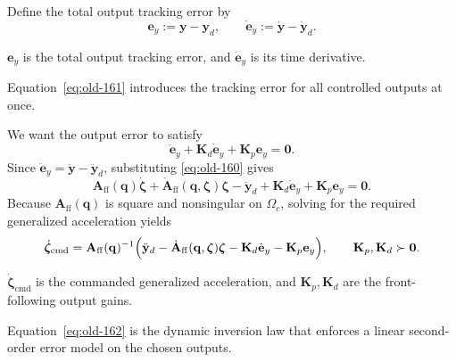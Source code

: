 \documentclass[12pt,a4paper]{report}
\newcommand{\newsymbols}[1]{\par\noindent{}#1\par\vspace{0.35em}}
\newcommand{\formulaannotation}[1]{\par\noindent{}#1\par\vspace{0.35em}}
\begin{document}
Define the total output tracking error by
\begin{equation}
\mathbf{e}_y := \mathbf{y} - \mathbf{y}_d,
\qquad
\dot{\mathbf{e}}_y := \dot{\mathbf{y}} - \dot{\mathbf{y}}_d.
\label{eq:old-161}
\end{equation}
\newsymbols{$\mathbf{e}_y$ is the total output tracking error, and $\dot{\mathbf{e}}_y$ is its time derivative.}
\formulaannotation{Equation~\eqref{eq:old-161} introduces the tracking error for all controlled outputs at once.}

We want the output error to satisfy
\begin{equation}
\ddot{\mathbf{e}}_y + \mathbf{K}_d\dot{\mathbf{e}}_y + \mathbf{K}_p\mathbf{e}_y = \mathbf{0}.
\end{equation}
Since $\ddot{\mathbf{e}}_y = \ddot{\mathbf{y}} - \ddot{\mathbf{y}}_d$, substituting \eqref{eq:old-160} gives
\begin{equation}
\mathbf{A}_{\mathrm{ff}}(\mathbf{q})\dot{\boldsymbol{\zeta}} +
\dot{\mathbf{A}}_{\mathrm{ff}}(\mathbf{q},\boldsymbol{\zeta})\boldsymbol{\zeta}
- \ddot{\mathbf{y}}_d
+ \mathbf{K}_d\dot{\mathbf{e}}_y
+ \mathbf{K}_p\mathbf{e}_y
= \mathbf{0}.
\end{equation}
Because $\mathbf{A}_{\mathrm{ff}}(\mathbf{q})$ is square and nonsingular on $\Omega_c$, solving for the required generalized acceleration yields
\begin{equation}
\dot{\boldsymbol{\zeta}}_{\mathrm{cmd}} =
\mathbf{A}_{\mathrm{ff}}(\mathbf{q})^{-1}
\Bigl(
\ddot{\mathbf{y}}_d -
\dot{\mathbf{A}}_{\mathrm{ff}}(\mathbf{q},\boldsymbol{\zeta}) \boldsymbol{\zeta}
-
\mathbf{K}_d \dot{\mathbf{e}}_y
-
\mathbf{K}_p \mathbf{e}_y
\Bigr),
\qquad
\mathbf{K}_p, \mathbf{K}_d \succ \mathbf{0}.
\label{eq:old-162}
\end{equation}
\newsymbols{$\dot{\boldsymbol{\zeta}}_{\mathrm{cmd}}$ is the commanded generalized acceleration, and $\mathbf{K}_p,\mathbf{K}_d$ are the front-following output gains.}
\formulaannotation{Equation~\eqref{eq:old-162} is the dynamic inversion law that enforces a linear second-order error model on the chosen outputs.}
\end{document}

